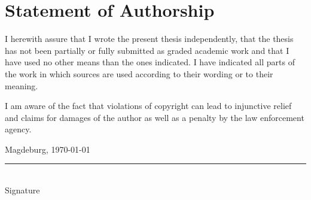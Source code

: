 \documentclass[
	12pt,
	a4paper,
	abstract,
	bibliography=totoc,
	chapterprefix,
	headings=openright,
	numbers=endperiod,
	parskip=half,
	twoside,
]{scrreprt}
\begin{document}
\section*{Statement of Authorship}

I herewith assure that I wrote the present thesis independently, that the thesis has not been partially or fully submitted as graded academic work and that I have used no other means than the ones indicated.
I have indicated all parts of the work in which sources are used according to their wording or to their meaning.

I am aware of the fact that violations of copyright can lead to injunctive relief and claims for damages of the author as well as a penalty by the law enforcement agency.

\bigskip

Magdeburg, \today

\bigskip
\bigskip

\rule{0.5\textwidth}{0.5pt}\\
\hspace*{0.25em}Signature
\end{document}
